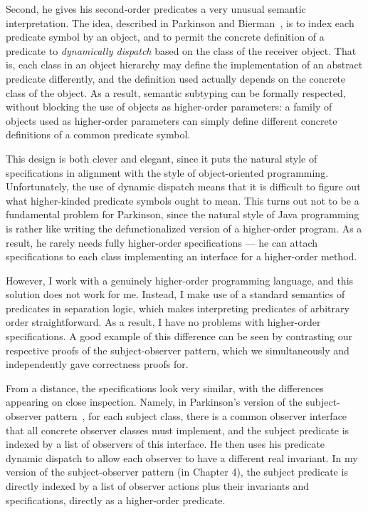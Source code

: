 Second, he gives his second-order predicates a very unusual semantic
interpretation. The idea, described in Parkinson and
Bierman~\cite{parkinson-bierman-05}, is to index each predicate symbol
by an object, and to permit the concrete definition of a predicate to
\emph{dynamically dispatch} based on the class of the receiver
object. That is, each class in an object hierarchy may define the
implementation of an abstract predicate differently, and the
definition used actually depends on the concrete class of the
object. As a result, semantic subtyping can be formally respected,
without blocking the use of objects as higher-order parameters: a
family of objects used as higher-order parameters can simply define
different concrete definitions of a common predicate symbol.

This design is both clever and elegant, since it puts the natural
style of specifications in alignment with the style of object-oriented
programming. Unfortunately, the use of dynamic dispatch means that it
is difficult to figure out what higher-kinded predicate symbols ought
to mean.  This turns out not to be a fundamental problem for
Parkinson, since the natural style of Java programming is rather like
writing the defunctionalized version of a higher-order program. As a
result, he rarely needs fully higher-order specifications --- he can
attach specifications to each class implementing an interface for a
higher-order method.

However, I work with a genuinely higher-order programming language,
and this solution does not work for me. Instead, I make use of a
standard semantics of predicates in separation logic, which makes
interpreting predicates of arbitrary order straightforward. As a
result, I have no problems with higher-order specifications. A good
example of this difference can be seen by contrasting our respective
proofs of the subject-observer pattern, which we simultaneously and
independently gave correctness proofs for.

From a distance, the specifications look very similar, with the
differences appearing on close inspection. Namely, in Parkinson's
version of the subject-observer pattern~\cite{parkinson-iwaco-07}, for
each subject class, there is a common observer interface that all
concrete observer classes must implement, and the subject predicate is
indexed by a list of observers of this interface. He then uses his
predicate dynamic dispatch to allow each observer to have a different
real invariant. In my version of the subject-observer pattern (in
Chapter 4), the subject predicate is directly indexed by a list of
observer actions plus their invariants and specifications, directly as
a higher-order predicate.

